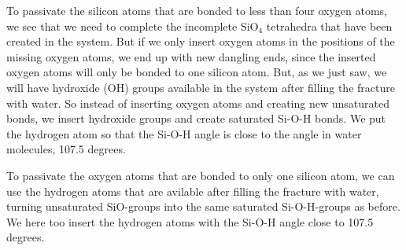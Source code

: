 
To passivate the silicon atoms that are bonded to less than four oxygen atoms, we see that we need to complete the incomplete SiO$_4$ tetrahedra that have been created in the system. But if we only insert oxygen atoms in the positions of the missing oxygen atoms, we end up with new dangling ends, since the inserted oxygen atoms will only be bonded to one silicon atom. But, as we just saw, we will have hydroxide (OH) groups available in the system after filling the fracture with water. So instead of inserting oxygen atoms and creating new unsaturated bonds, we insert hydroxide groups and create saturated Si-O-H bonds. We put the hydrogen atom so that the Si-O-H angle is close to the angle in water molecules, 107.5 degrees. %

To passivate the oxygen atoms that are bonded to only one silicon atom, we can use the hydrogen atoms that are avilable after filling the fracture with water, turning unsaturated SiO-groups into the same saturated Si-O-H-groups as before. We here too insert the hydrogen atoms with the Si-O-H angle close to 107.5 degrees.

